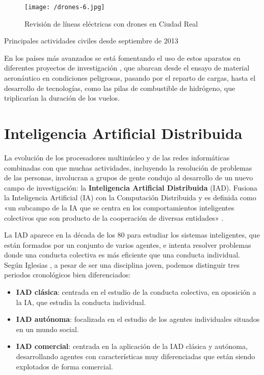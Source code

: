 \begin{figure}[!h]
\begin{center}
\texttt{[image: /drones-6.jpg]}
\caption[Revisión de líneas eléctricas con drones en Ciudad Real]{Revisión de líneas eléctricas con drones en Ciudad Real \cite{unionfenosa}}
\label{fig:unionfenosa}
\end{center}
\end{figure}


\begin{table}[htbp]
  \centering
  {\small
  
  }
  \caption[Principales actividades civiles desde septiembre de 2013]
  {Principales actividades civiles desde septiembre de 2013 \cite{ambitocivil2}}
  \label{tab:ambitocivil2}
\end{table}

En los países más avanzados se está fomentando el uso de estos aparatos en diferentes proyectos de investigación \cite{UA}, que abarcan desde el ensayo de material aeronáutico en condiciones peligrosas, pasando por el reparto de cargas, hasta el desarrollo de tecnologías, como las pilas de combustible de hidrógeno, que triplicarían la duración de los vuelos.

\section{Inteligencia Artificial Distribuida}
\label{sec:inteligenciaartificial}

La evolución de los procesadores multinúcleo y de las redes informáticas combinadas con que muchas actividades, incluyendo la resolución de problemas de las personas, involucran a grupos de gente condujo al desarrollo de un nuevo campo de investigación: la \textbf{Inteligencia Artificial Distribuida} (\acs{IAD}). Fusiona la Inteligencia Artificial (\acs{IA}) con la Computación Distribuida y es definida como «un subcampo de la \acs{IA} que se centra en los comportamientos inteligentes colectivos que son producto de la cooperación de diversas entidades» \cite{IAD}.

La \acs{IAD} aparece en la década de los 80 para estudiar los sistemas inteligentes, que están formados por un conjunto de varios agentes, e intenta resolver problemas donde una conducta colectiva es más eficiente que una conducta individual. Según Iglesias \cite{IAD2}, a pesar de ser una disciplina joven, podemos distinguir tres periodos cronológicos bien diferenciados:

\begin{itemize}
\item \textbf{\acs{IAD} clásica}: centrada en el estudio de la conducta colectiva, en oposición a la \acs{IA}, que estudia la conducta individual.
\item \textbf{\acs{IAD} autónoma}: focalizada en el estudio de los agentes individuales situados en un mundo social.
\item \textbf{\acs{IAD} comercial}: centrada en la aplicación de la \acs{IAD} clásica y autónoma, desarrollando agentes con características muy
diferenciadas que están siendo explotados de forma comercial.
\end{itemize}

